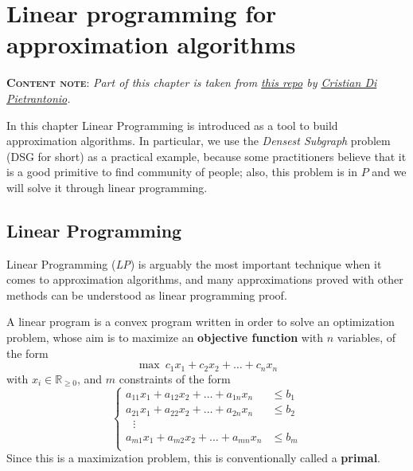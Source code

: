 \chapter[Linear programming for approximation algorithms]{Linear programming for approximation algorithms}\label{sec:linear-programming}

\textbf{\textsc{Content note}}: \emph{Part of this chapter is taken from \href{https://github.com/Halolegend94/uni_social_behavioral_networks/blob/master/chapters/ch05-densest-subgraph.tex}{this repo} by \href{https://github.com/Halolegend94}{Cristian Di Pietrantonio}.}
\vspace{2ex}

In this chapter Linear Programming is introduced as a tool to build approximation algorithms. In particular, we use the \textit{Densest Subgraph} problem (DSG for short) as a practical example, because some practitioners believe that it is a good primitive to find community of people; also, this problem is in $P$ and we will solve it through linear programming.


\section[Linear Programming]{Linear Programming
\raisebox{.3\baselineskip}{\normalsize\footnotemark}}
\label{sec:linear-programming-intro}

Linear Programming (\textit{LP}) is arguably the most important technique when it comes to approximation algorithms, and many approximations proved with other methods can be understood as linear programming proof.

\begin{defn}\label{primal}
    A linear program is a convex program written in order to solve an optimization problem, whose aim is to maximize an \textbf{objective function} with $n$ variables, of the form
    \begin{equation}
    \max\ c_1 x_1 + c_2 x_2 + \ldots + c_n x_n
    \end{equation}
    with $x_i \in \mathbb{R}_{\geq 0}$, and $m$ constraints of the form
    \begin{equation}
    \begin{cases}
    a_{11} x_1 + a_{12} x_2 + \ldots + a_{1n} x_n &\leq b_1\\
    a_{21} x_1 + a_{22} x_2 + \ldots + a_{2n} x_n &\leq b_2\\
    \ \ \ \vdots\\
    a_{m1} x_1 + a_{m2} x_2 + \ldots + a_{mn} x_n &\leq b_m\\
    \end{cases}
    \end{equation}
    Since this is a maximization problem, this is conventionally called a \textbf{primal}.
\end{defn}

